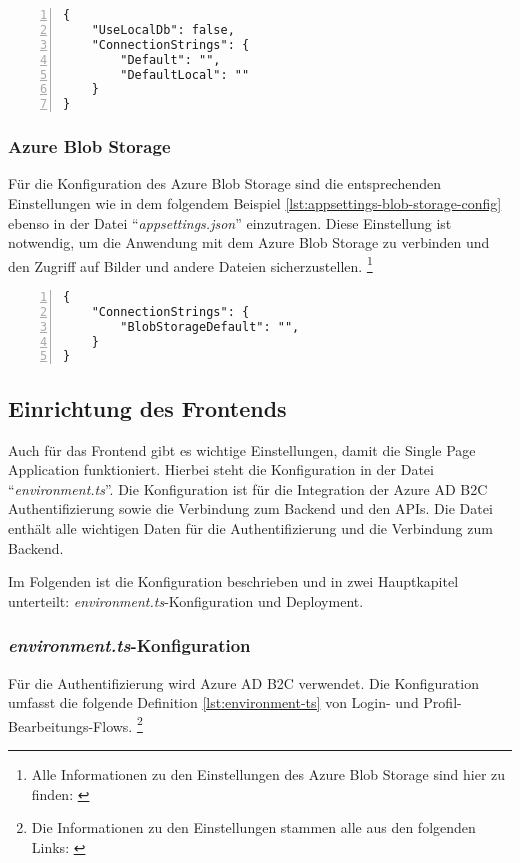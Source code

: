 \begin{lstlisting}[numbers=left,caption={appsettings.json},label={lst:appsettings-db-config}]
{
    "UseLocalDb": false,
    "ConnectionStrings": {
        "Default": "",
        "DefaultLocal": ""
    }
}
\end{lstlisting}

\subsubsection{Azure Blob Storage}

Für die Konfiguration des Azure Blob Storage sind die entsprechenden Einstellungen wie in 
dem folgendem Beispiel \ref{lst:appsettings-blob-storage-config} ebenso in der Datei 
``\emph{appsettings.json}'' einzutragen. Diese Einstellung ist notwendig, um die 
Anwendung mit dem Azure Blob Storage zu verbinden und den Zugriff auf Bilder und 
andere Dateien sicherzustellen.
\footnote{Alle Informationen zu den Einstellungen des Azure Blob Storage sind hier zu finden: \cite{MicrosoftCorporationm}}

\begin{lstlisting}[numbers=left,caption={appsettings.json},label={lst:appsettings-blob-storage-config}]
{
    "ConnectionStrings": {
        "BlobStorageDefault": "",
    }
}
\end{lstlisting}


\subsection{Einrichtung des Frontends}

Auch für das Frontend gibt es wichtige Einstellungen, damit die Single Page Application
funktioniert. Hierbei steht die Konfiguration in der Datei ``\emph{environment.ts}''.
Die Konfiguration ist für die Integration der Azure AD B2C Authentifizierung sowie die 
Verbindung zum Backend und den APIs. Die Datei enthält alle wichtigen Daten für 
die Authentifizierung und die Verbindung zum Backend. 

Im Folgenden ist die Konfiguration beschrieben und in zwei Hauptkapitel unterteilt: 
\emph{environment.ts}-Konfiguration und Deployment.


\subsubsection{\emph{environment.ts}-Konfiguration}

Für die Authentifizierung wird Azure AD B2C verwendet. Die Konfiguration umfasst 
die folgende Definition \ref{lst:environment-ts} von Login- und Profil-Bearbeitungs-Flows.
\footnote{Die Informationen zu den Einstellungen stammen alle aus den folgenden Links: \cite{MicrosoftCorporationh} \cite{MicrosoftCorporationg}}

